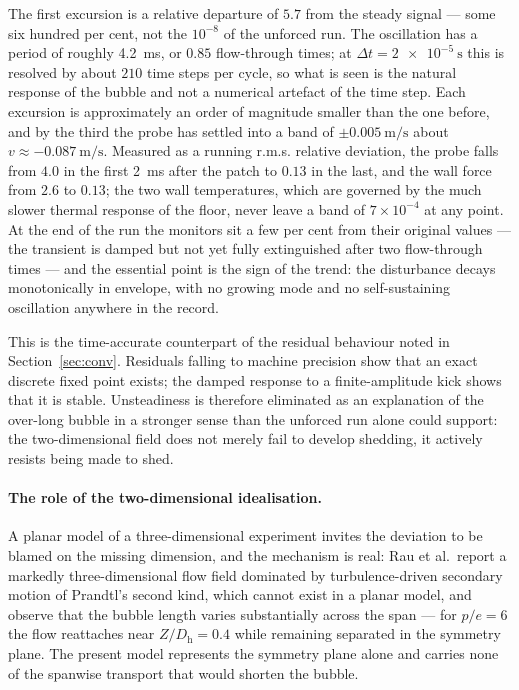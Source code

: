 \documentclass[11pt,a4paper]{article}
\newcommand{\Dh}{D_{\mathrm{h}}}
\begin{document}
The first excursion is a relative departure of $5.7$ from the steady
signal --- some six hundred per cent, not the $10^{-8}$ of the unforced run.
The oscillation has a period of roughly \SI{4.2}{\milli\second}, or $0.85$
flow-through times; at $\Delta t = \SI{2e-5}{\second}$ this is resolved by
about $210$ time steps per cycle, so what is seen is the natural response of
the bubble and not a numerical artefact of the time step. Each excursion is
approximately an order of magnitude smaller than the one before, and by the
third the probe has settled into a band of
$\pm\SI{0.005}{\meter\per\second}$ about
$v \approx \SI{-0.087}{\meter\per\second}$. Measured as a running r.m.s.
relative deviation, the probe falls from $4.0$ in the first
\SI{2}{\milli\second} after the patch to $0.13$ in the last, and the wall
force from $2.6$ to $0.13$; the two wall temperatures, which are governed by
the much slower thermal response of the floor, never leave a band of
$7 \times 10^{-4}$ at any point. At the end of the run the monitors sit a
few per cent from their original values --- the transient is damped but not
yet fully extinguished after two flow-through times --- and the essential
point is the sign of the trend: the disturbance decays monotonically in
envelope, with no growing mode and no self-sustaining oscillation anywhere
in the record.

This is the time-accurate counterpart of the residual behaviour noted in
Section~\ref{sec:conv}. Residuals falling to machine precision show that an
exact discrete fixed point exists; the damped response to a finite-amplitude
kick shows that it is stable. Unsteadiness is therefore eliminated as an
explanation of the over-long bubble in a stronger sense than the unforced
run alone could support: the two-dimensional field does not merely fail to
develop shedding, it actively resists being made to shed.

\paragraph{The role of the two-dimensional idealisation.}
A planar model of a three-dimensional experiment invites the deviation to be
blamed on the missing dimension, and the mechanism is real: Rau et al.\
report a markedly three-dimensional flow field dominated by
turbulence-driven secondary motion of Prandtl's second kind, which cannot
exist in a planar model, and observe that the bubble length varies
substantially across the span --- for $p/e = 6$ the flow reattaches near
$Z/\Dh = 0.4$ while remaining separated in the symmetry plane. The present
model represents the symmetry plane alone and carries none of the spanwise
transport that would shorten the bubble.
\end{document}

